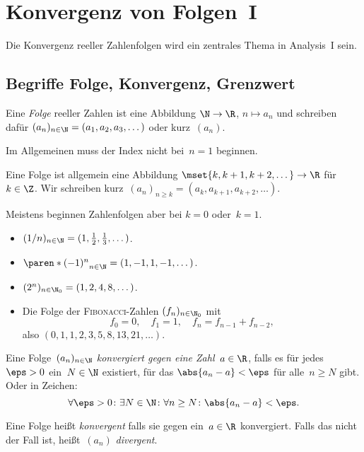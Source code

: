 \documentclass[a4paper]{article}
\begin{document}
\section{Konvergenz von Folgen~I}

Die Konvergenz reeller Zahlenfolgen wird ein zentrales Thema in Analysis~I sein.

\subsection{Begriffe Folge, Konvergenz, Grenzwert}

\begin{definition}[Folge]
    Eine \emph{Folge} reeller Zahlen ist eine Abbildung $\N \to \R$, $n \mapsto a_n$ und schreiben dafür $(a_n)_{n \in \N} = (a_1, a_2, a_3, \dots)$ oder kurz~$(a_n)$.
\end{definition}

Im Allgemeinen muss der Index nicht bei~$n = 1$ beginnen.

\begin{definition}
    Eine Folge ist allgemein eine Abbildung $\mset{k, k+1, k+2, \dots} \to \R$ für~$k \in \Z$. Wir schreiben kurz~$(a_n)_{n \geq k} = (a_k, a_{k+1}, a_{k+2}, \dots)$.
\end{definition}

Meistens beginnen Zahlenfolgen aber bei $k = 0$ oder~$k = 1$.

\begin{example}\leavevmode
    \begin{itemize}
        \item $(1/n)_{n \in \N} = (1, \frac{1}{2}, \frac{1}{3}, \dots)$.
        \item $\paren*{(-1)^n}_{n \in \N} = (1, -1, 1, -1, \dots)$.
        \item $(2^n)_{n \in \N_0} = (1, 2, 4, 8, \dots)$.
        \item Die Folge der \textsc{Fibonacci}-Zahlen $(f_n)_{n \in \N_0}$ mit
              \begin{equation*}
                  f_0 = 0,\quad f_1 = 1,\quad f_n = f_{n-1} + f_{n-2},
              \end{equation*}
              also $(0, 1, 1, 2, 3, 5, 8, 13, 21, \dots)$.
    \end{itemize}
\end{example}


\begin{definition}[Konvergenz]\label{def:convergence}
    Eine Folge~$(a_n)_{n \in \N}$ \emph{konvergiert gegen eine Zahl~$a \in \R$}, falls es für jedes~$\eps > 0$ ein~$N \in \N$ existiert, für das $\abs{a_n - a} < \eps$ für alle~$n \geq N$ gibt. Oder in Zeichen:
    \begin{equation*}
        \forall \eps > 0\colon \exists N \in \N\colon \forall n \geq N\colon \abs{a_n - a} < \eps.
    \end{equation*}

    Eine Folge heißt \emph{konvergent} falls sie gegen ein~$a \in \R$ konvergiert. Falls das nicht der Fall ist, heißt~$(a_n)$ \emph{divergent}.
\end{definition}
\end{document}
